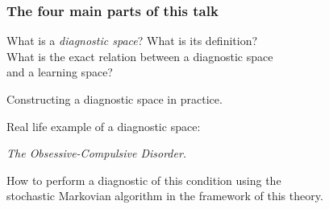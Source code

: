 \documentclass{beamer}
\begin{document}
   \begin{frame}
\frametitle{The four main parts of this talk} 
\begin{roster}
\item What is a {\sl diagnostic space}? What is its definition? \\
What is the exact relation between a diagnostic space\\ and a learning space?
\item Constructing a diagnostic space  in practice.
\item Real life example of a diagnostic space: \\[1mm]
\centerline{\sl The Obsessive-Compulsive Disorder.}
\item How to perform a diagnostic of this condition using the\\ stochastic Markovian  algorithm 
in the framework of this theory.
\end{roster}
\vspace{1cm}

\end{frame}
\end{document}
